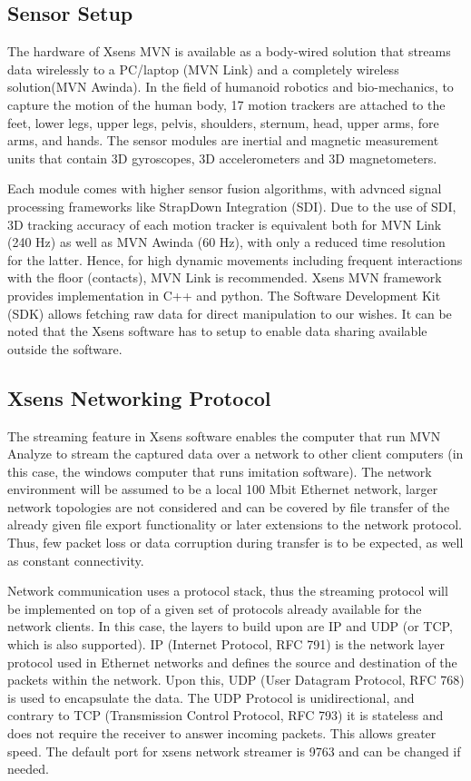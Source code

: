 \subsection{Sensor Setup}
The hardware of Xsens MVN is available as a body-wired solution that streams data wirelessly to a PC/laptop (MVN Link) and a completely wireless solution(MVN Awinda). 
In the field of humanoid robotics and bio-mechanics, to capture the motion of the human body, 17 motion trackers are attached to the feet, lower legs, upper legs, pelvis, shoulders, sternum, head, upper arms, fore arms, and hands. The sensor modules are inertial and magnetic measurement units that contain 3D gyroscopes, 3D accelerometers and 3D magnetometers.

Each module comes with higher sensor fusion algorithms, with advnced signal processing frameworks like StrapDown Integration (SDI). Due to the use of SDI, 3D tracking accuracy of each motion tracker is equivalent both for MVN Link (240 Hz) as well as MVN Awinda (60 Hz), 
with only a reduced time resolution for the latter. Hence, for high dynamic movements including frequent interactions with the floor (contacts), MVN Link is recommended. Xsens MVN framework provides implementation in C++ and python. The Software Development Kit (SDK) allows 
fetching raw data for direct manipulation to our wishes. It can be noted that the Xsens software has to setup to enable data sharing available outside the software.

\subsection{Xsens Networking Protocol}

The streaming feature in Xsens software enables the computer that run MVN Analyze to stream the captured data over a network to other client computers (in this case, 
the windows computer that runs imitation software). The network environment will be assumed to be a local 100 Mbit Ethernet network, larger network topologies are not 
considered and can be covered by file transfer of the already given file export functionality or later extensions to the network protocol. Thus, few packet loss or data 
corruption during transfer is to be expected, as well as constant connectivity.

Network communication uses a protocol stack, thus the streaming protocol will be implemented on top of a given set of protocols already available for the network clients. 
In this case, the layers to build upon are IP and UDP (or TCP, which is also supported). IP (Internet Protocol, RFC 791) is the network layer protocol used in Ethernet networks 
and defines the source and destination of the packets within the network. Upon this, UDP (User Datagram Protocol, RFC 768) is used to encapsulate the data. The UDP Protocol is 
unidirectional, and contrary to TCP (Transmission Control Protocol, RFC 793) it is stateless and does not require the receiver to answer incoming packets. This allows greater speed.
The default port for xsens network streamer is 9763 and can be changed if needed.

